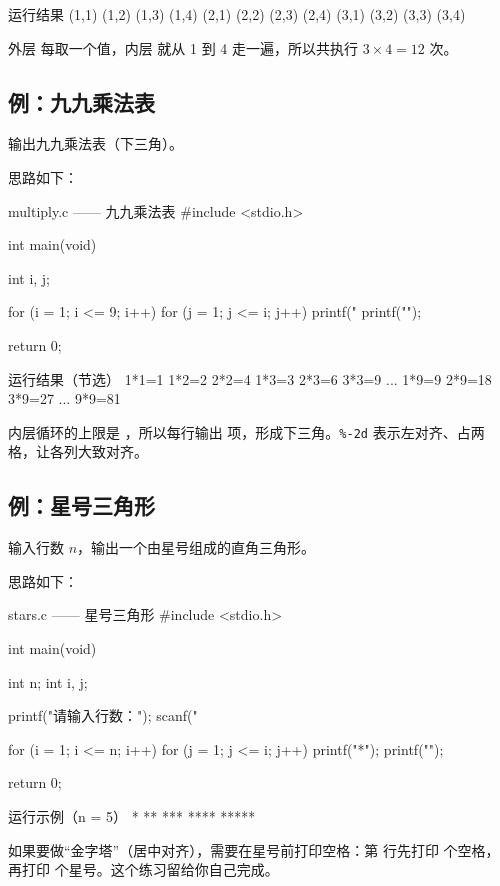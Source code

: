 \begin{outbox}{运行结果}
(1,1) (1,2) (1,3) (1,4) 
(2,1) (2,2) (2,3) (2,4) 
(3,1) (3,2) (3,3) (3,4) 
\end{outbox}

外层  每取一个值，内层  就从 1 到 4 走一遍，所以共执行 $3 \times 4 = 12$ 次。

\subsection{例：九九乘法表}

\begin{example}
输出九九乘法表（下三角）。
\end{example}
\begin{solution}
思路如下：

\begin{codebox}{multiply.c —— 九九乘法表}
#include <stdio.h>

int main(void)
{
    int i, j;

    for (i = 1; i <= 9; i++) {
        for (j = 1; j <= i; j++) {
            printf("%
        }
        printf("\n");
    }

    return 0;
}
\end{codebox}

\begin{outbox}{运行结果（节选）}
1*1=1  
1*2=2  2*2=4  
1*3=3  2*3=6  3*3=9  
...
1*9=9  2*9=18 3*9=27 ... 9*9=81
\end{outbox}

内层循环的上限是 ，所以每行输出  项，形成下三角。\texttt{\%-2d} 表示左对齐、占两格，让各列大致对齐。
\end{solution}

\subsection{例：星号三角形}

\begin{example}
输入行数 $n$，输出一个由星号组成的直角三角形。
\end{example}
\begin{solution}
思路如下：

\begin{codebox}{stars.c —— 星号三角形}
#include <stdio.h>

int main(void)
{
    int n;
    int i, j;

    printf("请输入行数：");
    scanf("%

    for (i = 1; i <= n; i++) {
        for (j = 1; j <= i; j++) {
            printf("*");
        }
        printf("\n");
    }

    return 0;
}
\end{codebox}

\begin{outbox}{运行示例（n = 5）}
*
**
***
****
*****
\end{outbox}

如果要做“金字塔”（居中对齐），需要在星号前打印空格：第  行先打印  个空格，再打印  个星号。这个练习留给你自己完成。
\end{solution}

